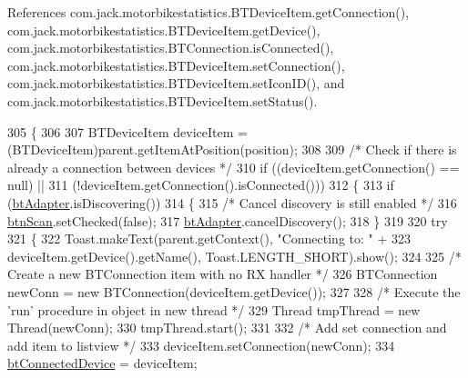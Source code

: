 References com.\+jack.\+motorbikestatistics.\+B\+T\+Device\+Item.\+get\+Connection(), com.\+jack.\+motorbikestatistics.\+B\+T\+Device\+Item.\+get\+Device(), com.\+jack.\+motorbikestatistics.\+B\+T\+Connection.\+is\+Connected(), com.\+jack.\+motorbikestatistics.\+B\+T\+Device\+Item.\+set\+Connection(), com.\+jack.\+motorbikestatistics.\+B\+T\+Device\+Item.\+set\+Icon\+I\+D(), and com.\+jack.\+motorbikestatistics.\+B\+T\+Device\+Item.\+set\+Status().


\begin{DoxyCode}
305                                                                                          \{
306 
307             BTDeviceItem deviceItem = (BTDeviceItem)parent.getItemAtPosition(position);
308 
309             \textcolor{comment}{/* Check if there is already a connection between devices */}
310             \textcolor{keywordflow}{if} ((deviceItem.getConnection() == null) ||
311                     (!deviceItem.getConnection().isConnected()))
312             \{
313                 \textcolor{keywordflow}{if} (\hyperlink{classcom_1_1jack_1_1motorbikestatistics_1_1_pair_device_fragment_ac21b65a91245ae03ebba675e41166ace}{btAdapter}.isDiscovering())
314                 \{
315                     \textcolor{comment}{/* Cancel discovery is still enabled */}
316                     \hyperlink{classcom_1_1jack_1_1motorbikestatistics_1_1_pair_device_fragment_a1bf1c9b623a1b9891e0d574006cf8d5f}{btnScan}.setChecked(\textcolor{keyword}{false});
317                     \hyperlink{classcom_1_1jack_1_1motorbikestatistics_1_1_pair_device_fragment_ac21b65a91245ae03ebba675e41166ace}{btAdapter}.cancelDiscovery();
318                 \}
319 
320                 \textcolor{keywordflow}{try}
321                 \{
322                     Toast.makeText(parent.getContext(), \textcolor{stringliteral}{"Connecting to: "} +
323                             deviceItem.getDevice().getName(), Toast.LENGTH\_SHORT).show();
324 
325                     \textcolor{comment}{/* Create a new BTConnection item with no RX handler */}
326                     BTConnection newConn = \textcolor{keyword}{new} BTConnection(deviceItem.getDevice());
327 
328                     \textcolor{comment}{/* Execute the 'run' procedure in object in new thread */}
329                     Thread tmpThread = \textcolor{keyword}{new} Thread(newConn);
330                     tmpThread.start();
331 
332                     \textcolor{comment}{/* Add set connection and add item to listview */}
333                     deviceItem.setConnection(newConn);
334                     \hyperlink{classcom_1_1jack_1_1motorbikestatistics_1_1_pair_device_fragment_afb95960b8365f4696444ea7683ebbf93}{btConnectedDevice} = deviceItem;

\end{DoxyCode}
